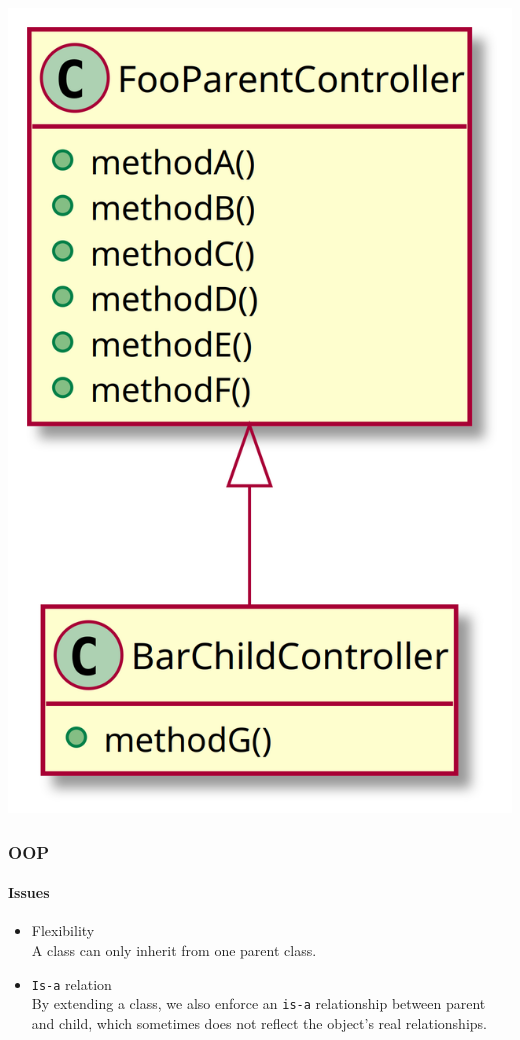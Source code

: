 \begin{frame}[fragile,c]
    \begin{center}
        \includegraphics[height=\textheight]{src/session--composition-and-inheritance/resources/break-encapsulation.png}
    \end{center}
\end{frame}

\begin{frame}
    \frametitle{OOP}
    \framesubtitle{Issues}

    \begin{itemize}
        \item Flexibility\pause
              \\\textcolor{ecgrey!50}{A class can only inherit from one parent class.}
        \pause
        \item \texttt{Is-a} relation\pause
              \textcolor{ecgrey!50}{
              \\By extending a class, we also enforce an \texttt{is-a} relationship between
              parent and child, which sometimes does not reflect the object’s real relationships.}
    \end{itemize}
\end{frame}

